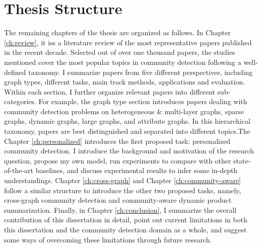 \section{Thesis Structure}
The remaining chapters of the thesis are organized as follows. In Chapter \ref{ch:review}, it iss a literature review of the most representative papers published in the recent decade. Selected out of over one thousand papers, the studies mentioned cover the most popular topics in community detection following a well-defined taxonomy. I summarize papers from five different perspectives, including graph types, different tasks, main track methods, applications and evaluation. Within each section, I further organize relevant papers into different sub-categories. For example, the graph type section introduces papers dealing with community detection problems on heterogeneous \& multi-layer graphs, sparse graphs, dynamic graphs, large graphs, and attribute graphs. In this hierarchical taxonomy, papers are best distinguished and separated into different topics.The Chapter \ref{ch:personalized}  introduces the first proposed task: personalized community detection. I introduce the background and motivation of the research question, propose my own model, run experiments to compare with other state-of-the-art baselines, and discuss experimental results to infer some in-depth understandings. Chapter \ref{ch:cross-graph} and Chapter \ref{ch:community-aware} follow a similar structure to introduce the other two proposed tasks, namely, cross-graph community detection and community-aware dynamic product summarization. Finally, in Chapter \ref{ch:conclusion}, I summarize the overall contribution of this dissertation in detail, point out current limitations in both this dissertation and the community detection domain as a whole, and suggest some ways of overcoming these limitations through future research.

